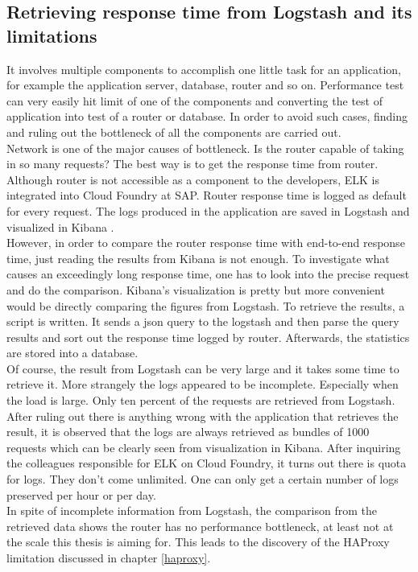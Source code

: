 \subsection{Retrieving response time from Logstash and its limitations}
It involves multiple components to accomplish one little task for an application, for example the application server, database, router and so on. Performance test can very easily hit limit of one of the components and converting the test of application into test of a router or database. In order to avoid such cases, finding and ruling out the bottleneck of all the components are carried out. \\
Network is one of the major causes of bottleneck. Is the router capable of taking in so many requests? The best way is to get the response time from router. Although router is not accessible as a component to the developers, \ac{ELK} \citep{ELK} is integrated into Cloud Foundry at SAP. Router response time is logged as default for every request. The logs produced in the application are saved in Logstash\citep{Logstash} and visualized in Kibana \citep{Kibana}. \\ 
However, in order to compare the router response time with end-to-end response time, just reading the results from Kibana is not enough. To investigate what causes an exceedingly long response time, one has to look into the precise request and do the comparison. Kibana's visualization is pretty but more convenient would be directly comparing the figures from Logstash. To retrieve the results, a script is written. It sends a json query to the logstash and then parse the query results and sort out the response time logged by router. Afterwards, the statistics are stored into a database.\\
Of course, the result from Logstash can be very large and it takes some time to retrieve it. More strangely the logs appeared to be incomplete. Especially when the load is large. Only ten percent of the requests are retrieved from Logstash. After ruling out there is anything wrong with the application that retrieves the result, it is observed that the logs are always retrieved as bundles of 1000 requests which can be clearly seen from visualization in Kibana. After inquiring the colleagues responsible for ELK on Cloud Foundry,  it turns out there is quota for logs. They don't come unlimited. One can only get a certain number of logs preserved per hour or per day.\\
In spite of incomplete information from Logstash, the comparison from the retrieved data shows the router has no performance bottleneck, at least not at the scale this thesis is aiming for. This leads to the discovery of the HAProxy limitation discussed in chapter \ref{haproxy}. 


